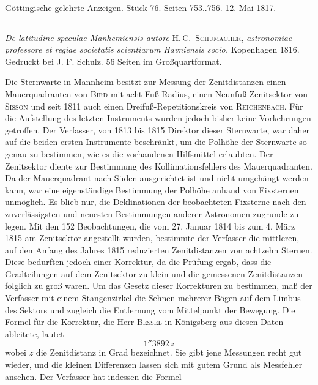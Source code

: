 \clearpage
{}
\hypertarget{native-602-lower}{}
\begin{center}\small Göttingische gelehrte Anzeigen. Stück 76. Seiten 753..756. 12. Mai 1817.\\[3pt]\rule{.72\linewidth}{.3pt}\end{center}

\emph{De latitudine speculae Manhemiensis autore} H.\,C.\ \textsc{Schumacher},
\emph{astronomiae professore et regiae societatis scientiarum Havniensis
socio.} Kopenhagen 1816. Gedruckt bei J. F. Schulz. 56 Seiten im Großquartformat.

\begingroup{}\relax
Die Sternwarte in Mannheim besitzt zur Messung der Zenitdistanzen einen Mauerquadranten von \textsc{Bird} mit acht Fuß Radius, einen Neunfuß-Zenitsektor von \textsc{Sisson} und seit 1811 auch einen Dreifuß-Repetitionskreis von \textsc{Reichenbach}. Für die Aufstellung des letzten Instruments wurden jedoch bisher keine Vorkehrungen getroffen. Der Verfasser, von 1813 bis 1815 Direktor dieser Sternwarte, war daher auf die beiden ersten Instrumente beschränkt, um die Polhöhe der Sternwarte so genau zu bestimmen, wie es die vorhandenen Hilfsmittel erlaubten. Der Zenitsektor diente zur Bestimmung des Kollimationsfehlers des Mauerquadranten. Da der Mauerquadrant nach Süden ausgerichtet ist und nicht umgehängt werden kann, war eine eigenständige Bestimmung der Polhöhe anhand von Fixsternen unmöglich. Es blieb nur, die Deklinationen der beobachteten Fixsterne nach den zuverlässigsten und neuesten Bestimmungen anderer Astronomen zugrunde zu legen. Mit den 152 Beobachtungen, die vom 27. Januar 1814 bis zum 4. März 1815 am Zenitsektor angestellt wurden, bestimmte der Verfasser die mittleren, auf den Anfang des Jahres 1815 reduzierten Zenitdistanzen von achtzehn Sternen. Diese bedurften jedoch einer Korrektur, da die Prüfung ergab, dass die Gradteilungen auf dem Zenitsektor zu klein und die gemessenen Zenitdistanzen folglich zu groß waren.
Um das Gesetz dieser Korrekturen zu bestimmen, maß der Verfasser mit einem Stangenzirkel die Sehnen mehrerer Bögen auf dem Limbus des Sektors und zugleich die Entfernung vom Mittelpunkt der Bewegung.
Die Formel für die Korrektur, die Herr \textsc{Bessel} in Königsberg aus diesen Daten ableitete, lautet
\[
1''3892\,z
\]
wobei $z$ die Zenitdistanz in Grad bezeichnet. Sie gibt jene Messungen recht gut wieder, und die kleinen Differenzen lassen sich mit gutem Grund als Messfehler ansehen.
Der Verfasser hat indessen die Formel
